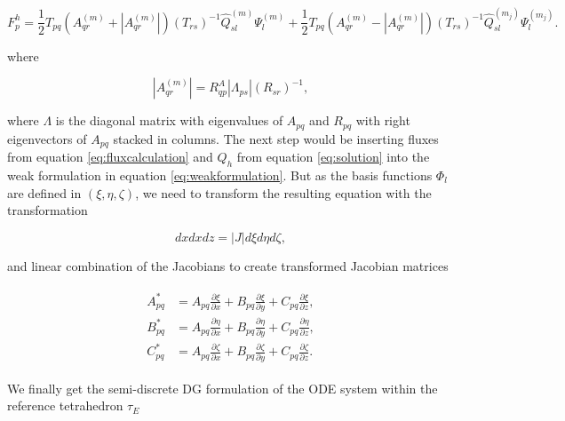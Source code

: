 \begin{equation}
    F_p^h = \frac{1}{2} T_{pq} \left(A_{qr}^{\left(m\right)} + \left|A_{qr}^{\left(m\right)}\right|\right)\left(T_{rs}\right)^{-1}
    \hat{Q}_{sl}^{\left(m\right)} \Psi_l^{\left(m\right)} + \frac{1}{2}T_{pq}\left(A_{qr}^{\left(m\right)} - \left|A_{qr}^{\left(m\right)}\right|\right)
    \left(T_{rs}\right)^{-1}\hat{Q}_{sl}^{\left(m_j\right)}\Psi_l^{\left(m_j\right)}.
    \label{eq:fluxcalculation}
\end{equation}

where

\begin{equation}
\left|A_{qr}^{\left(m\right)}\right| = R_{qp}^A \left|\Lambda_{ps}\right| \left(R_{sr}\right)^{-1},
\end{equation}
    
where $\Lambda$ is the diagonal matrix with eigenvalues of $A_{pq}$ and $R_{pq}$ with right eigenvectors of $A_{pq}$ stacked in columns.
The next step would be inserting fluxes from equation \ref{eq:fluxcalculation} and $Q_h$ from equation \ref{eq:solution} into the weak
formulation in equation \ref{eq:weakformulation}. But as the basis functions $\Phi_l$ are defined in $\left(\xi, \eta, \zeta\right)$, we need
to transform the resulting equation with the transformation

\begin{equation}
    dx dx dz = \left|J\right| d\xi d\eta d\zeta,
\end{equation}

and linear combination of the Jacobians to create transformed Jacobian matrices

\begin{align}
    \begin{split}
        A_{pq}^{*} &= A_{pq} \frac{\partial \xi}{\partial x} + B_{pq} \frac{\partial \xi}{\partial y} + C_{pq} \frac{\partial \xi}{\partial z}, \\
        B_{pq}^{*} &= A_{pq} \frac{\partial \eta}{\partial x} + B_{pq} \frac{\partial \eta}{\partial y} + C_{pq} \frac{\partial \eta}{\partial z}, \\ 
        C_{pq}^{*} &= A_{pq} \frac{\partial \zeta}{\partial x} + B_{pq} \frac{\partial \zeta}{\partial y} + C_{pq} \frac{\partial \zeta}{\partial z}. 
    \end{split}
\end{align}

We finally get the semi-discrete \ac{DG} formulation of the ODE system within the reference tetrahedron $\tau_E$
